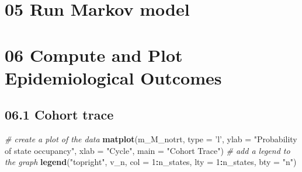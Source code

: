 \documentclass[
]{article}
\newenvironment{Shaded}{\begin{snugshade}}{\end{snugshade}}
\newcommand{\CommentTok}[1]{\textcolor[rgb]{0.56,0.35,0.01}{\textit{#1}}}
\newcommand{\ControlFlowTok}[1]{\textcolor[rgb]{0.13,0.29,0.53}{\textbf{#1}}}
\newcommand{\DataTypeTok}[1]{\textcolor[rgb]{0.13,0.29,0.53}{#1}}
\newcommand{\DecValTok}[1]{\textcolor[rgb]{0.00,0.00,0.81}{#1}}
\newcommand{\KeywordTok}[1]{\textcolor[rgb]{0.13,0.29,0.53}{\textbf{#1}}}
\newcommand{\NormalTok}[1]{#1}
\newcommand{\OperatorTok}[1]{\textcolor[rgb]{0.81,0.36,0.00}{\textbf{#1}}}
\newcommand{\StringTok}[1]{\textcolor[rgb]{0.31,0.60,0.02}{#1}}
\begin{document}
\hypertarget{run-markov-model}{%
\section{05 Run Markov model}\label{run-markov-model}}

\begin{Shaded}
\end{Shaded}

\hypertarget{compute-and-plot-epidemiological-outcomes}{%
\section{06 Compute and Plot Epidemiological
Outcomes}\label{compute-and-plot-epidemiological-outcomes}}

\hypertarget{cohort-trace-1}{%
\subsection{06.1 Cohort trace}\label{cohort-trace-1}}

\begin{Shaded}
\begin{Highlighting}[]
\CommentTok{# create a plot of the data}
\KeywordTok{matplot}\NormalTok{(m_M_notrt, }\DataTypeTok{type =} \StringTok{'l'}\NormalTok{, }
        \DataTypeTok{ylab =} \StringTok{"Probability of state occupancy"}\NormalTok{,}
        \DataTypeTok{xlab =} \StringTok{"Cycle"}\NormalTok{,}
        \DataTypeTok{main =} \StringTok{"Cohort Trace"}\NormalTok{)             }
\CommentTok{# add a legend to the graph}
\KeywordTok{legend}\NormalTok{(}\StringTok{"topright"}\NormalTok{, v_n, }\DataTypeTok{col =} \DecValTok{1}\OperatorTok{:}\NormalTok{n_states, }\DataTypeTok{lty =} \DecValTok{1}\OperatorTok{:}\NormalTok{n_states, }\DataTypeTok{bty =} \StringTok{"n"}\NormalTok{) }
\end{Highlighting}
\end{Shaded}
\end{document}
